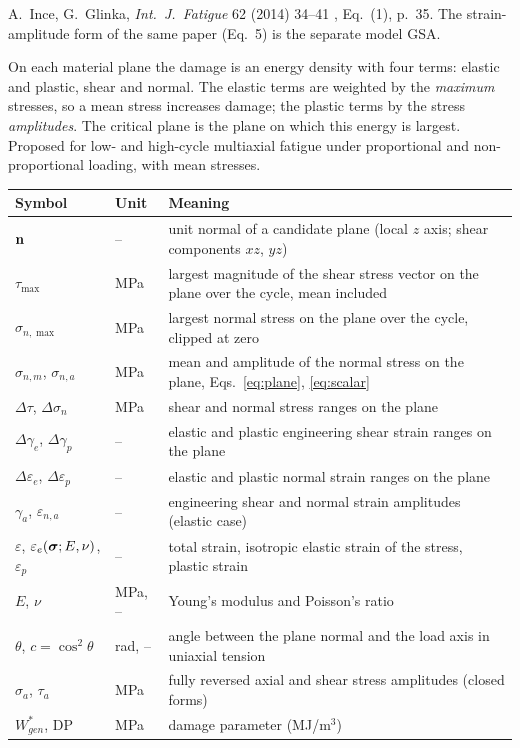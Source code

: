 \label{sheet:GSE}

 A.~Ince, G.~Glinka, \emph{Int.\ J.\ Fatigue} 62 (2014) 34--41 \cite{ince2014},
Eq.~(1), p.~35. The strain-amplitude form of the same paper (Eq.~5) is the separate model GSA.

 On each material plane the damage is an energy density with four terms:
elastic and plastic, shear and normal. The elastic terms are weighted by the \emph{maximum}
stresses, so a mean stress increases damage; the plastic terms by the stress \emph{amplitudes}.
The critical plane is the plane on which this energy is largest. Proposed for low- and high-cycle
multiaxial fatigue under proportional and non-proportional loading, with mean stresses.

\begin{center}\small
\begin{tabular}{@{}llp{100mm}@{}}
\toprule
Symbol & Unit & Meaning\\\midrule
$\mathbf n$ & -- & unit normal of a candidate plane (local $z$ axis; shear components $xz$, $yz$)\\
$\tau_{\max}$ & MPa & largest magnitude of the shear stress vector on the plane over the cycle, mean included\\
$\sigma_{n,\max}$ & MPa & largest normal stress on the plane over the cycle, clipped at zero\\
$\sigma_{n,m}$, $\sigma_{n,a}$ & MPa & mean and amplitude of the normal stress on the plane, Eqs.~\eqref{eq:plane}, \eqref{eq:scalar}\\
$\Delta\tau$, $\Delta\sigma_n$ & MPa & shear and normal stress ranges on the plane\\
$\Delta\gamma_e$, $\Delta\gamma_p$ & -- & elastic and plastic engineering shear strain ranges on the plane\\
$\Delta\varepsilon_e$, $\Delta\varepsilon_p$ & -- & elastic and plastic normal strain ranges on the plane\\
$\gamma_a$, $\varepsilon_{n,a}$ & -- & engineering shear and normal strain amplitudes (elastic case)\\
$\varepsilon$, $\varepsilon_e(\boldsymbol\sigma;E,\nu)$, $\varepsilon_p$ & -- & total strain, isotropic elastic strain of the stress, plastic strain\\
$E$, $\nu$ & MPa, -- & Young's modulus and Poisson's ratio\\
$\theta$, $c=\cos^2\theta$ & rad, -- & angle between the plane normal and the load axis in uniaxial tension\\
$\sigma_a$, $\tau_a$ & MPa & fully reversed axial and shear stress amplitudes (closed forms)\\
$W^*_{gen}$, $\mathrm{DP}$ & MPa & damage parameter (MJ/m$^3$)\\
\bottomrule
\end{tabular}
\end{center}


